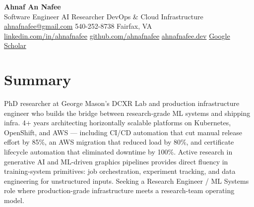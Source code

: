 \documentclass[letterpaper,10pt]{article}
\begin{document}
\begin{center}
  {\LARGE\bfseries\color{accent} Ahnaf An Nafee }\\[3pt]
  {\normalsize Software Engineer \textbar{} AI Researcher \textbar{} DevOps \& Cloud Infrastructure }\\[4pt]
  \small
  \href{mailto:ahnafnafee@gmail.com}{ahnafnafee@gmail.com} \textbar{}
  540-252-8738 \textbar{}
  Fairfax, VA\\
  \href{https://linkedin.com/in/ahnafnafee}{linkedin.com/in/ahnafnafee} \textbar{}
  \href{https://github.com/ahnafnafee}{github.com/ahnafnafee} \textbar{}
  \href{https://www.ahnafnafee.dev}{ahnafnafee.dev} \textbar{} \href{https://scholar.google.com/citations?user=u15DO0cAAAAJ}{Google Scholar}
\end{center}

\section*{Summary}
PhD researcher at George Mason's DCXR Lab and production infrastructure engineer who builds the bridge between research-grade ML systems and shipping infra. 4+ years architecting horizontally scalable platforms on Kubernetes, OpenShift, and AWS --- including CI/CD automation that cut manual release effort by 85\%, an AWS migration that reduced load by 80\%, and certificate lifecycle automation that eliminated downtime by 100\%. Active research in generative AI and ML-driven graphics pipelines provides direct fluency in training-system primitives: job orchestration, experiment tracking, and data engineering for unstructured inputs. Seeking a Research Engineer / ML Systems role where production-grade infrastructure meets a research-team operating model.

\end{document}
